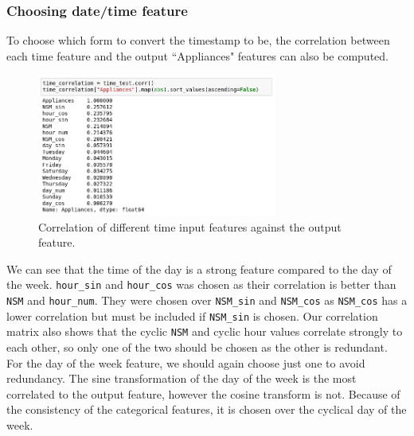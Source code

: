 \documentclass{article}
\newcommand{\n}[0]{\\[\baselineskip]}
\begin{document}
\subsubsection{Choosing date/time feature}
To choose which form to convert the timestamp to be, the correlation between each time feature and the output ``Appliances" features can also be computed. 
\begin{figure}[H]
\centering
\includegraphics[width=0.7\textwidth, keepaspectratio]{imgs/time-correlation.png}
\caption{Correlation of different time input features against the output feature.}
\end{figure}
\noindent
We can see that the time of the day is a strong feature compared to the day of the week.  \texttt{hour\_sin} and \texttt{hour\_cos} was chosen as their correlation is better than \texttt{NSM} and \texttt{hour\_num}. They were chosen over \texttt{NSM\_sin} and \texttt{NSM\_cos} as \texttt{NSM\_cos} has a lower correlation but must be included if \texttt{NSM\_sin} is chosen. Our correlation matrix also shows that the cyclic \texttt{NSM} and cyclic hour values correlate strongly to each other, so only one of the two should be chosen as the other is redundant. 
\n
For the day of the week feature, we should again choose just one to avoid redundancy. The sine transformation of the day of the week is the most correlated to the output feature, however the cosine transform is not. Because of the consistency of the categorical features, it is chosen over the cyclical day of the week. 
\end{document}
